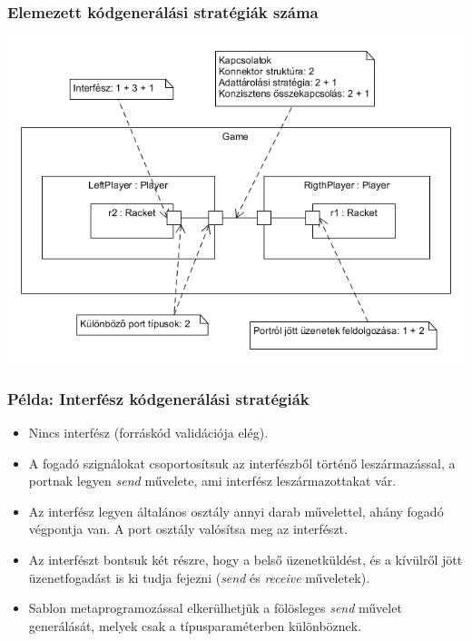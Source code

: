 \documentclass[11pt]{beamer}
\begin{document}
\begin{frame}
	\frametitle{Elemezett kódgenerálási stratégiák száma}
	
	\begin{center}
	\includegraphics[scale=0.45]{vedes_demo_count.png}
	\end{center}
\end{frame}

\begin{frame}
	\frametitle{Példa: Interfész kódgenerálási stratégiák}
	\begin{itemize}
		\item Nincs interfész (forráskód validációja elég).
			\item 	A fogadó szignálokat csoportosítsuk az interfészből történő leszármazással, a portnak legyen \textit{send} művelete, ami interfész leszármazottakat vár.
			\item 	Az interfész legyen általános osztály annyi darab művelettel, ahány fogadó végpontja van. A port osztály valósítsa meg az interfészt. 
			\item	Az interfészt bontsuk két részre, hogy a belső üzenetküldést, és a kívülről jött üzenetfogadást is ki tudja fejezni (\textit{send} és \textit{receive} műveletek).
			\item  Sablon metaprogramozással elkerülhetjük a fölösleges \textit{send} művelet generálását, melyek csak a típusparaméterben különböznek.
	\end{itemize}
\end{frame}
\end{document}
